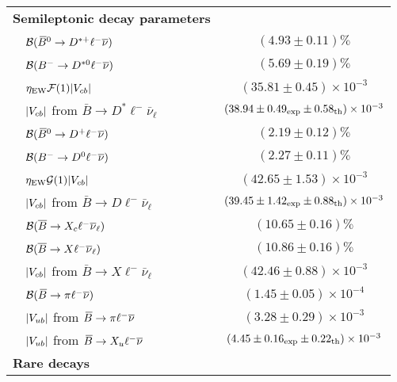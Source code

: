 \begin{longtable}{|l|c|}
{\bf\boldmath Semileptonic \B decay parameters} & \\
 ~~${\cal B}(\kern 0.18em\overline{\kern -0.18em B}{}^0\to D^{*+}\ell^-\overline{\nu})$ & $(4.93\pm 0.11)\%$\\
 ~~${\cal B}(B^-\to D^{*0}\ell^-\overline{\nu})$ & $(5.69\pm 0.19)\%$\\
 ~~$\eta_{\rm EW}{\cal F}(1)|V_{cb}|$ & $(35.81\pm 0.45)\times 10^{-3}$\\
 ~~$|V_{cb}|$ from $\bar B\to D^*\ell^-\bar\nu_\ell$ & $(38.94\pm
 0.49_{\rm exp}\pm 0.58_{\rm th})\times 10^{-3}$\\
\hline
 ~~${\cal B}(\kern 0.18em\overline{\kern -0.18em B}{}^0\to D^+\ell^-\overline{\nu})$ & $(2.19\pm 0.12)\%$\\
 ~~${\cal B}(B^-\to D^0\ell^-\overline{\nu})$ & $(2.27\pm 0.11)\%$\\
 ~~$\eta_{\rm EW}{\cal G}(1)|V_{cb}|$ & $(42.65 \pm 1.53)\times 10^{-3}$\\
 ~~$|V_{cb}|$ from $\bar B\to D\ell^-\bar\nu_\ell$ & $(39.45\pm 1.42_{\rm
 exp}\pm 0.88_{\rm th})\times 10^{-3}$\\
\hline
 ~~${\cal B}(\bar B\to X_c\ell^-\bar\nu_\ell)$ & $(10.65\pm 0.16)\%$\\
 ~~${\cal B}(\bar B\to X\ell^-\bar\nu_\ell)$ & $(10.86\pm 0.16)\%$\\
 ~~$|V_{cb}|$ from $\bar B\to X\ell^-\bar\nu_\ell$ & $(42.46\pm
 0.88)\times 10^{-3}$\\
\hline
 ~~${\cal B}(\kern 0.18em\overline{\kern -0.18em B}{}\to\pi\ell^-\overline{\nu})$ & $(1.45\pm 0.05)\times 10^{-4}$\\
 ~~$|V_{ub}|$ from $\kern 0.18em\overline{\kern -0.18em B}{}\to\pi\ell^-\overline{\nu}$ & $(3.28\pm 0.29)\times
 10^{-3}$\\
 ~~$|V_{ub}|$ from $\kern 0.18em\overline{\kern -0.18em B}{}\to X_u\ell^-\overline{\nu}$ & $(4.45\pm 0.16_{\rm exp}\pm
 0.22_{\rm th})\times 10^{-3}$\\
\hline
{\bf\boldmath Rare \B decays} &   \\

\end{longtable}

